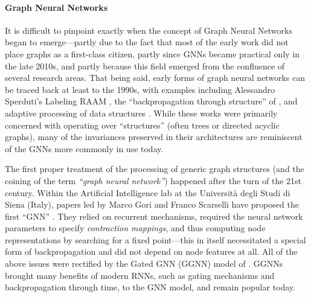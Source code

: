 


\paragraph{Graph Neural Networks}
It is difficult to pinpoint exactly when the concept of Graph Neural Networks began to emerge---partly due to the fact that most of the early work  did not place graphs as a first-class citizen, partly since GNNs became practical only in the late 2010s, and partly because this field emerged from the confluence of several research areas. That being said, early forms of graph neural networks can be traced back at least to the 1990s, with examples including Alessandro Sperduti's Labeling RAAM \citep{sperduti1994encoding}, the ``backpropagation through structure'' of %
\cite{goller1996learning}, and adaptive processing of data structures %
\citep{sperduti1997supervised,frasconi1998general}. While these works were primarily concerned with operating over ``structures'' (often trees or directed acyclic graphs), many of the invariances preserved in their architectures are reminiscent of the GNNs more commonly in use today. 



The first proper treatment of the processing of generic graph structures (and the coining of the term \emph{``graph neural network''}) happened after the turn of the 21st century. Within the Artificial Intelligence lab at the Universit\`{a} degli Studi di Siena (Italy), papers led by Marco Gori and Franco Scarselli have proposed the first ``GNN'' \citep{gori2005new,scarselli2008graph}. They relied on recurrent mechanisms, required the neural network parameters to specify \emph{contraction mappings}, and thus computing node representations by searching for a fixed point---this in itself necessitated a special form of backpropagation \citep{almeida1990learning,pineda1988generalization} and did not depend on node features at all. All of the above issues were rectified by the Gated GNN (GGNN) model of \cite{li2015gated}. GGNNs brought many benefits of modern RNNs, such as gating mechanisms \citep{cho2014learning} and backpropagation through time, to the GNN model, and remain popular today.


